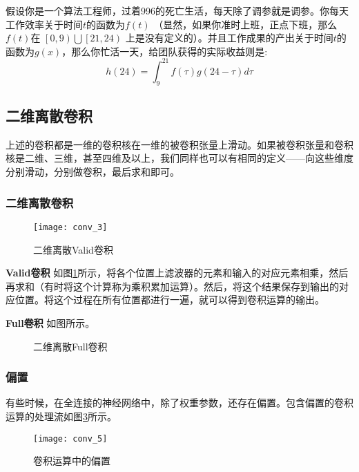         假设你是一个算法工程师，过着996的死亡生活，每天除了调参就是调参。你每天工作效率关于时间$t$的函数为$f\left(t\right)$ （显然，如果你准时上班，正点下班，那么$f\left(t\right) $在 $\left[0,9\right) \bigcup \left[ 21,24 \right)$ 上是没有定义的）。并且工作成果的产出关于时间$t$的函数为$g\left(x\right)$，那么你忙活一天，给团队获得的实际收益则是: 
        $$ h\left(24\right) = \int_{9}^{21} {f\left(\tau \right) g\left(24-\tau \right)d\tau} $$
    \subsection{二维离散卷积}
        上述的卷积都是一维的卷积核在一维的被卷积张量上滑动。如果被卷积张量和卷积核是二维、三维，甚至四维及以上，我们同样也可以有相同的定义——向这些维度分别滑动，分别做卷积，最后求和即可。
        \subsubsection{二维离散卷积}
        
        \begin{figure}[!htbp]
            \centering
            \texttt{[image: conv\_3]}
            \caption{二维离散Valid卷积}
            \label{fig:3}
        \end{figure}
    
        \textbf{Valid卷积} \quad 如图\ref{fig:3}所示，将各个位置上滤波器的元素和输入的对应元素相乘，然后再求和（有时将这个计算称为乘积累加运算）。然后，将这个结果保存到输出的对应位置。将这个过程在所有位置都进行一遍，就可以得到卷积运算的输出。
        
    
        \textbf{Full卷积} \quad 如图所示。
      
        \begin{figure}
            \centering
            \caption{二维离散Full卷积}
            \label{fig:4}
        \end{figure}
    
        \subsubsection{偏置}
        
        有些时候，在全连接的神经网络中，除了权重参数，还存在偏置。包含偏置的卷积运算的处理流如图\ref{fig:5}所示。
        
        \begin{figure}[!htbp]
            \centering
            \texttt{[image: conv\_5]}
            \caption{卷积运算中的偏置}
            \label{fig:5}
        \end{figure}
        
        